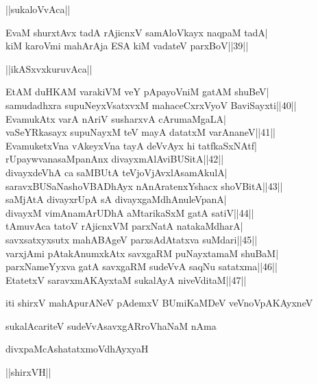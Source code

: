 \documentclass{article}
\begin{document}
\begin{center}
||sukaloVvAca||
\end{center}

EvaM shurxtAvx tadA rAjicnxV samAloVkayx naqpaM tadA|\\
kiM karoVmi mahArAja ESA kiM vadateV parxBoV||39||\\

\begin{center}
||ikASxvxkuruvAca||
\end{center}

EtAM duHKAM varakiVM veY pApayoVniM gatAM shuBeV|\\
samudadhxra supuNeyxVsatxvxM mahaceCxrxVyoV BaviSayxti||40||\\
EvamukAtx varA nAriV susharxvA cArumaMgaLA|\\
vaSeYRkasayx supuNayxM teV mayA datatxM varAnaneV||41||\\
EvamuketxVna vAkeyxVna tayA deVvAyx hi tatfkaSxNAtf|\\
rUpaywvanasaMpanAnx divayxmAlAviBUSitA||42||\\
divayxdeVhA ca saMBUtA teVjoVjAvxlAsamAkulA|\\
saravxBUSaNashoVBADhAyx nAnAratenxYshacx shoVBitA||43||\\
saMjAtA divayxrUpA sA divayxgaMdhAnuleVpanA|\\
divayxM vimAnamArUDhA aMtarikaSxM gatA satiV||44||\\
tAmuvAca tatoV rAjicnxVM parxNatA natakaMdharA|\\
savxsatxyxsutx mahABAgeV parxsAdAtatxva suMdari||45||\\
varxjAmi pAtakAnumxkAtx savxgaRM puNayxtamaM shuBaM|\\
parxNameYyxva gatA savxgaRM sudeVvA saqNu satatxma||46||\\
EtatetxV saravxmAKAyxtaM sukalAyA niveVditaM||47||

\begin{center}
iti shirxV mahApurANeV pAdemxV BUmiKaMDeV veVnoVpAKAyxneV
\end{center}

\begin{center}
sukalAcariteV sudeVvAsavxgARroVhaNaM nAma
\end{center}

\begin{center}
divxpaMcAshatatxmoVdhAyxyaH
\end{center}

\begin{center}
||shirxVH||
\end{center}
\end{document}

